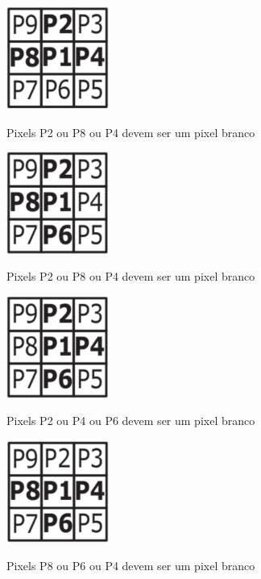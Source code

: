 \documentclass[12pt,oneside,a4paper,english,french,spanish,brazil,]{abntex2}
\begin{document}
\begin{figure}[ht]
\centering
\caption{Pixels P2 ou P8 ou P4 devem ser um pixel branco}
\includegraphics[width=0.3\textwidth]{imagens/PDI_Zhang_Suen_2.PNG}
\label{fig:PDI_Zhang_Suen_2}
\end{figure}

\begin{figure}[ht]
\centering
\caption{Pixels P2 ou P8 ou P4 devem ser um pixel branco}
\includegraphics[width=0.3\textwidth]{imagens/PDI_Zhang_Suen_3.PNG}
\label{fig:PDI_Zhang_Suen_3}
\end{figure}

\begin{figure}[ht]
\centering
\caption{Pixels P2 ou P4 ou P6 devem ser um pixel branco}
\includegraphics[width=0.3\textwidth]{imagens/PDI_Zhang_Suen_4.PNG}
\label{fig:PDI_Zhang_Suen_4}
\end{figure}

\begin{figure}[ht]
\centering
\caption{Pixels P8 ou P6 ou P4 devem ser um pixel branco}
\includegraphics[width=0.3\textwidth]{imagens/PDI_Zhang_Suen_5.PNG}
\label{fig:PDI_Zhang_Suen_5}
\end{figure}
\end{document}
